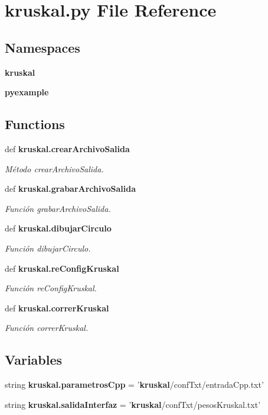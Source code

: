 \section{kruskal.\+py File Reference}
\label{kruskal_8py}
\subsection*{Namespaces}
\begin{DoxyCompactItemize}
\item 
 {\bf kruskal}
\item 
 {\bf pyexample}
\end{DoxyCompactItemize}
\subsection*{Functions}
\begin{DoxyCompactItemize}
\item 
def {\bf kruskal.\+crear\+Archivo\+Salida}
\begin{DoxyCompactList}\small\item\em Método crear\+Archivo\+Salida. \end{DoxyCompactList}\item 
def {\bf kruskal.\+grabar\+Archivo\+Salida}
\begin{DoxyCompactList}\small\item\em Función grabar\+Archivo\+Salida. \end{DoxyCompactList}\item 
def {\bf kruskal.\+dibujar\+Circulo}
\begin{DoxyCompactList}\small\item\em Función dibujar\+Circulo. \end{DoxyCompactList}\item 
def {\bf kruskal.\+re\+Config\+Kruskal}
\begin{DoxyCompactList}\small\item\em Función re\+Config\+Kruskal. \end{DoxyCompactList}\item 
def {\bf kruskal.\+correr\+Kruskal}
\begin{DoxyCompactList}\small\item\em Función correr\+Kruskal. \end{DoxyCompactList}\end{DoxyCompactItemize}
\subsection*{Variables}
\begin{DoxyCompactItemize}
\item 
string {\bf kruskal.\+parametros\+Cpp} = '{\bf kruskal}/conf\+Txt/entrada\+Cpp.\+txt'
\item 
string {\bf kruskal.\+salida\+Interfaz} = '{\bf kruskal}/conf\+Txt/pesos\+Kruskal.\+txt'
\end{DoxyCompactItemize}
